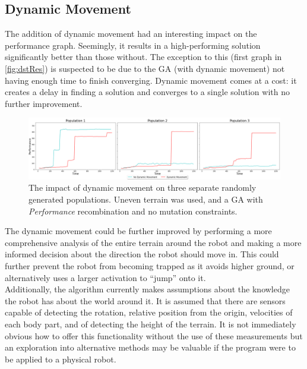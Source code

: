 \documentclass{article}
\begin{document}
\subsection{Dynamic Movement}
\label{sec:DST Res}
The addition of dynamic movement had an interesting impact on the performance graph. Seemingly, it results in a high-performing solution significantly better than those without. The exception to this (first graph in \autoref{fig:dstRes}) is suspected to be due to the GA (with dynamic movement) not having enough time to finish converging. Dynamic movement comes at a cost: it creates a delay in finding a solution and converges to a single solution with no further improvement.
\begin{figure}[H]
\centering
\centerline{\includegraphics[scale=0.55]{dstResults} }
\caption{The impact of dynamic movement on three separate randomly generated populations. Uneven terrain was used, and a GA with \textit{Performance} recombination and no mutation constraints.}
\label{fig:dstRes}
\end{figure}
The dynamic movement could be further improved by performing a more comprehensive analysis of the entire terrain around the robot and making a more informed decision about the direction the robot should move in. This could further prevent the robot from becoming trapped as it avoids higher ground, or alternatively uses a larger activation to “jump” onto it.\\ Additionally, the algorithm currently makes assumptions about the knowledge the robot has about the world around it. It is assumed that there are sensors capable of detecting the rotation, relative position from the origin, velocities of each body part, and of detecting the height of the terrain. It is not immediately obvious how to offer this functionality without the use of these measurements but an exploration into alternative methods may be valuable if the program were to be applied to a physical robot. \\
\end{document}
